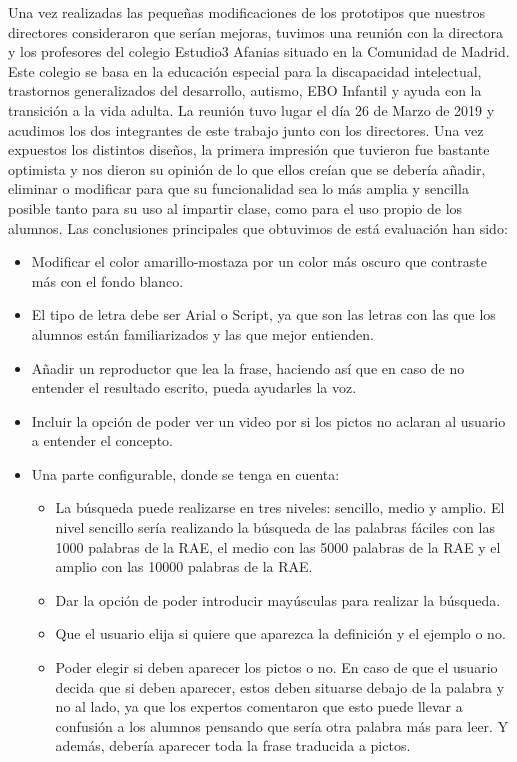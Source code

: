 Una vez realizadas las pequeñas modificaciones de los prototipos que nuestros directores consideraron que serían mejoras, tuvimos una reunión con la directora y los profesores del colegio Estudio3 Afanias situado en la Comunidad de Madrid. Este colegio se basa en la educación especial para la discapacidad intelectual, trastornos generalizados del desarrollo, autismo, EBO Infantil y ayuda con la transición a la vida adulta.
La reunión tuvo lugar el día 26 de Marzo de 2019 y acudimos los dos integrantes de este trabajo junto con los directores.
Una vez expuestos los distintos diseños, la primera impresión que tuvieron fue bastante optimista y nos dieron su opinión de lo que ellos creían que se debería añadir, eliminar o modificar para que su funcionalidad sea lo más amplia y sencilla posible tanto para su uso al impartir clase, como para el uso propio de los alumnos. 
Las conclusiones principales que obtuvimos de está evaluación han sido:
\begin{itemize} 
	\item Modificar el color amarillo-mostaza por un color más oscuro que contraste más con el fondo blanco.
	\item El tipo de letra debe ser Arial o Script, ya que son las letras con las que los alumnos están familiarizados y las que mejor entienden.
	\item Añadir un reproductor que lea la frase, haciendo así que en caso de no entender el resultado escrito, pueda ayudarles la voz.
	\item Incluir la opción de poder ver un video por si los pictos no aclaran al usuario a entender el concepto.
	\item Una parte configurable, donde se tenga en cuenta:
	\begin{itemize}
		\item La búsqueda puede realizarse en tres niveles: sencillo, medio y amplio. El nivel sencillo sería realizando la búsqueda de las palabras fáciles con las 1000 palabras de la RAE, el medio con las 5000 palabras de la RAE y el amplio con las 10000 palabras de la RAE. 
		\item Dar la opción de poder introducir mayúsculas para realizar la búsqueda.
		\item Que el usuario elija si quiere que aparezca la definición y el ejemplo o no.
		\item Poder elegir si deben aparecer los pictos o no. En caso de que el usuario decida que si deben aparecer, estos deben situarse debajo de la palabra y no al lado, ya que los expertos comentaron que esto puede llevar a confusión a los alumnos pensando que sería otra palabra más para leer. Y además, debería aparecer toda la frase traducida a pictos.
	\end{itemize}
\end{itemize}
